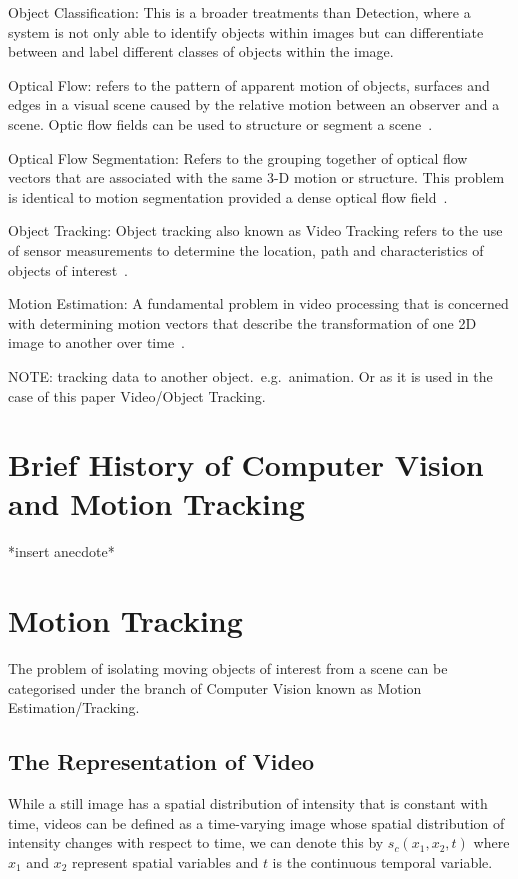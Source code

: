 Object Classification: This is a broader treatments than Detection, where a
system is not only able to identify objects within images but can differentiate
between and label different classes of objects within the image. 

Optical Flow: refers to the pattern of apparent motion of objects, surfaces and
edges in a visual scene caused by the relative motion between an observer and a
scene. Optic flow fields can be used to structure or segment a scene~\cite{Forsyth2012}.

Optical Flow Segmentation: Refers to the grouping together of optical flow
vectors that are associated with the same 3-D motion or structure. This problem
is identical to motion segmentation provided a dense optical flow field~\cite{Tekalp2014}.

Object Tracking: Object tracking also known as Video Tracking refers to the use
of sensor measurements to determine the location, path and characteristics of
objects of interest~\cite{Challa2011}.
 
Motion Estimation: A fundamental problem in video processing that is concerned
with determining motion vectors that describe the transformation of one 2D
image to another over time~\cite{Tekalp2014}.

NOTE:\@
tracking data to another object.\ e.g.\ animation. Or as it is used in the
case of this paper Video/Object Tracking.

\section{Brief History of Computer Vision and Motion Tracking}
*insert anecdote*


\section{Motion Tracking}
The problem of isolating moving objects of interest from a scene can
be categorised under the branch of Computer Vision known as Motion
Estimation/Tracking.

\subsection{The Representation of Video}
While a still image has a spatial distribution of intensity that is constant
with time, videos can be defined as a time-varying image whose spatial
distribution of intensity changes with respect to time, we can denote this by
$s_c(x_1,x_2,t)$ where $x_1$ and $x_2$ represent spatial variables and $t$ is
the continuous temporal variable.

